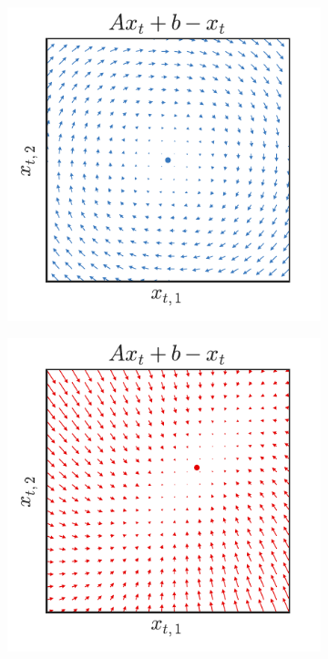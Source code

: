 \documentclass{article}
\begin{document}
\begin{figure}[t]
\centering%
\begin{subfigure}{.24\textwidth}
\includegraphics[width=\textwidth]{rotation_1}
\end{subfigure} 
\begin{subfigure}{.24\textwidth}
\includegraphics[width=\textwidth]{rotation_2}

\end{subfigure}
\end{figure}
\end{document}
